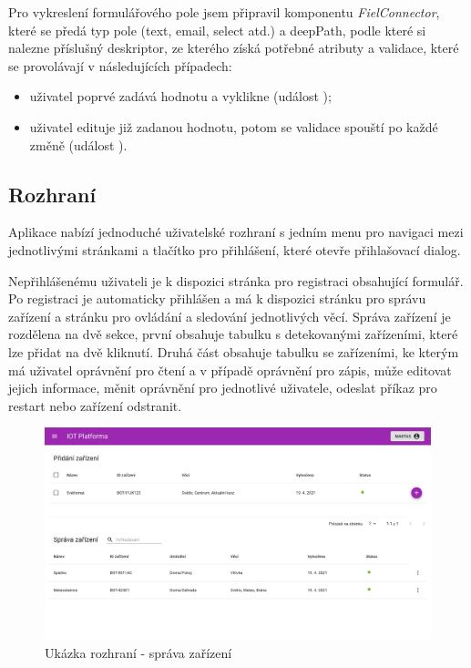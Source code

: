 Pro vykreslení formulářového pole jsem připravil komponentu \textit{FielConnector}, které se předá typ pole (text, email, select atd.) a deepPath, podle které si nalezne příslušný deskriptor, ze kterého získá potřebné atributy a validace, které se provolávají v následujících případech:
\begin{itemize}
    \item uživatel poprvé zadává hodnotu a vyklikne (událost );
    \item uživatel edituje již zadanou hodnotu, potom se validace spouští po každé změně (událost ).
\end{itemize}

\subsection{Rozhraní}
Aplikace nabízí jednoduché uživatelské rozhraní s jedním menu pro navigaci mezi jednotlivými stránkami a tlačítko pro přihlášení, které otevře přihlašovací dialog.

Nepřihlášenému uživateli je k dispozici stránka pro registraci obsahující formulář. Po registraci je automaticky přihlášen a má k dispozici stránku pro správu zařízení a stránku pro ovládání a sledování jednotlivých věcí. Správa zařízení je rozdělena na dvě sekce, první obsahuje tabulku s detekovanými zařízeními, které lze přidat na dvě kliknutí. Druhá část obsahuje tabulku se zařízeními, ke kterým má uživatel oprávnění pro čtení a v případě oprávnění pro zápis, může editovat jejich informace, měnit oprávnění pro jednotlivé uživatele, odeslat příkaz pro restart nebo zařízení odstranit.

\begin{figure}[htbp]
    \centering
    \includegraphics[width=\textwidth]{img/screens/deviceManagement2.png}
    \caption{Ukázka rozhraní - správa zařízení}
\end{figure}


